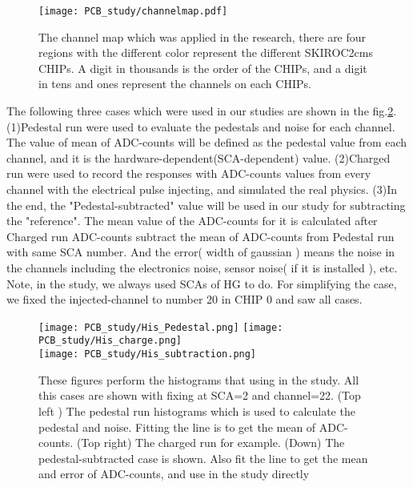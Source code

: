 \documentclass[12pt,twoside,a4paper,an,final]{cms-tdr}
\begin{document}
\begin{figure}[!htb]
\centering
     \texttt{[image: PCB\_study/channelmap.pdf]}
\caption{The channel map which was applied in the research, there are four regions with the different color represent the different SKIROC2cms CHIPs.  A digit in thousands is the order of the CHIPs, and a digit in tens and ones represent the channels on each CHIPs.}
\label{fig:PCB_study_channelMap}
\end{figure}

The following three cases which were used in our studies are shown in the fig.\ref{fig:PCB_His}. (1)Pedestal run were used to evaluate the pedestals and noise for each channel. The value of mean of ADC-counts will be defined as the pedestal value from each channel, and it is the hardware-dependent(SCA-dependent) value. (2)Charged run were used to record the responses with ADC-counts values from every channel with the electrical pulse injecting, and simulated the real physics. (3)In the end, the "Pedestal-subtracted" value will be used in our study for subtracting the "reference". The mean value of the ADC-counts for it is calculated after Charged run ADC-counts subtract the mean of ADC-counts from Pedestal run with same SCA number. And the error( width of gaussian ) means the noise in the channels including the electronics noise, sensor noise( if it is installed ), etc. Note, in the study, we always used SCAs of HG to do. For simplifying the case, we fixed the injected-channel to number 20 in CHIP 0 and saw all cases.

\begin{figure}[!htb]
\centering
     \texttt{[image: PCB\_study/His\_Pedestal.png]}
     \texttt{[image: PCB\_study/His\_charge.png]}\\
     \texttt{[image: PCB\_study/His\_subtraction.png]}
\caption{These figures perform the histograms that using in the study. All this cases are shown with fixing at SCA=2 and channel=22. (Top left ) The pedestal run histograms which is used to calculate the pedestal and noise. Fitting the line is to get the mean of ADC-counts. (Top right)  The charged run for example. (Down) The pedestal-subtracted case is shown. Also fit the line to get the mean and error of ADC-counts, and use in the study directly}
\label{fig:PCB_His}
\end{figure}
\end{document}
